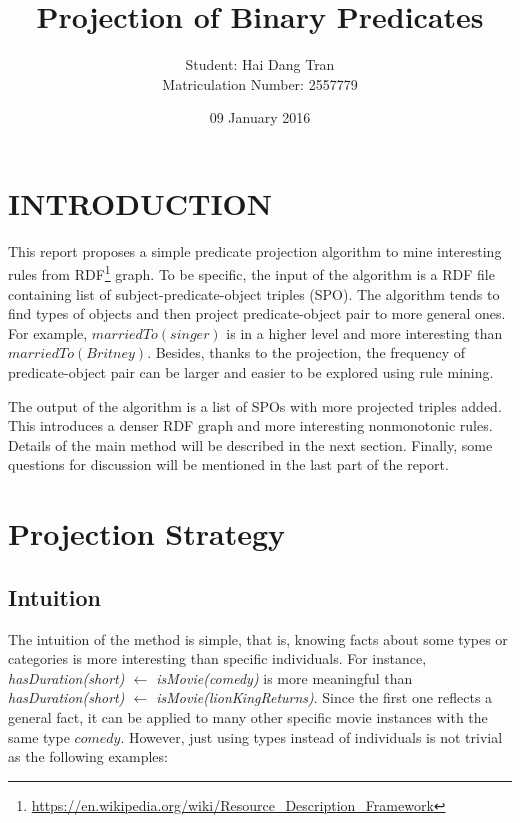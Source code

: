 \documentclass{acm_proc_article-sp}
\begin{document}
\title{Projection of Binary Predicates}
\author{
\alignauthor
Student: Hai Dang Tran\\Matriculation Number: 2557779
}
\date{09 January 2016}

\maketitle

\section{INTRODUCTION}
This report proposes a simple predicate projection algorithm to mine interesting rules from RDF\footnote{\url{https://en.wikipedia.org/wiki/Resource_Description_Framework}} graph. To be specific, the input of the algorithm is a RDF file containing list of subject-predicate-object triples (SPO). The algorithm tends to find types of objects and then project predicate-object pair to more general ones. For example, $marriedTo(singer)$ is in a higher level and more interesting than $marriedTo(Britney)$. Besides, thanks to the projection, the frequency of predicate-object pair can be larger and easier to be explored using rule mining.

The output of the algorithm is a list of SPOs with more projected triples added. This introduces a denser RDF graph and more interesting nonmonotonic rules. Details of the main method will be described in the next section. Finally, some questions for discussion will be mentioned in the last part of the report.

\section{Projection Strategy}

\subsection{Intuition}

The intuition of the method is simple, that is, knowing facts about some types or categories is more interesting than specific individuals. For instance, \textit{hasDuration(short) $\leftarrow$ isMovie(comedy)} is more meaningful than \textit{hasDuration(short) $\leftarrow$ isMovie(lionKingReturns)}. Since the first one reflects a general fact, it can be applied to many other specific movie instances with the same type $comedy$. However, just using types instead of individuals is not trivial as the following examples:
\end{document}

